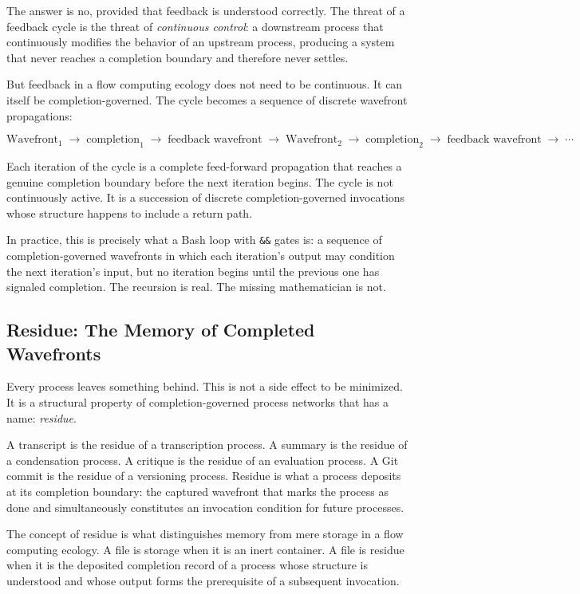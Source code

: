 \documentclass[12pt, a4paper]{article}
\begin{document}
The answer is no, provided that feedback is understood correctly.
The threat of a feedback cycle is the threat of \emph{continuous
control}: a downstream process that continuously modifies the
behavior of an upstream process, producing a system that never
reaches a completion boundary and therefore never settles.

But feedback in a flow computing ecology does not need to be
continuous. It can itself be completion-governed. The cycle becomes
a sequence of discrete wavefront propagations:

\[
\text{Wavefront}_1 \;\to\; \text{completion}_1 \;\to\;
\text{feedback wavefront} \;\to\; \text{Wavefront}_2 \;\to\;
\text{completion}_2 \;\to\; \text{feedback wavefront} \;\to\; \cdots
\]

Each iteration of the cycle is a complete feed-forward propagation
that reaches a genuine completion boundary before the next iteration
begins. The cycle is not continuously active. It is a succession of
discrete completion-governed invocations whose structure happens to
include a return path.

In practice, this is precisely what a Bash loop with
\texttt{\&\&} gates is: a sequence of completion-governed wavefronts
in which each iteration's output may condition the next iteration's
input, but no iteration begins until the previous one has signaled
completion. The recursion is real. The missing mathematician is not.

\subsection{Residue: The Memory of Completed Wavefronts}

Every process leaves something behind. This is not a side effect
to be minimized. It is a structural property of completion-governed
process networks that has a name: \emph{residue}.

A transcript is the residue of a transcription process. A summary
is the residue of a condensation process. A critique is the residue
of an evaluation process. A Git commit is the residue of a
versioning process. Residue is what a process deposits at its
completion boundary: the captured wavefront that marks the process
as done and simultaneously constitutes an invocation condition
for future processes.

The concept of residue is what distinguishes memory from mere
storage in a flow computing ecology. A file is storage when it is
an inert container. A file is residue when it is the deposited
completion record of a process whose structure is understood and
whose output forms the prerequisite of a subsequent invocation.
\end{document}
